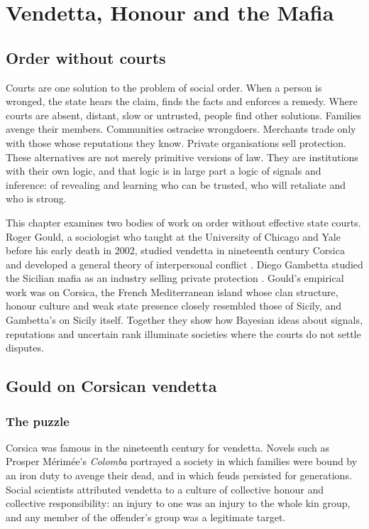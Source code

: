 \chapter{Vendetta, Honour and the Mafia}
\label{ch:gould}

\section{Order without courts}

Courts are one solution to the problem of social order. When a person is wronged, the state hears the claim, finds the facts and enforces a remedy. Where courts are absent, distant, slow or untrusted, people find other solutions. Families avenge their members. Communities ostracise wrongdoers. Merchants trade only with those whose reputations they know. Private organisations sell protection. These alternatives are not merely primitive versions of law. They are institutions with their own logic, and that logic is in large part a logic of signals and inference: of revealing and learning who can be trusted, who will retaliate and who is strong.

This chapter examines two bodies of work on order without effective state courts. Roger Gould, a sociologist who taught at the University of Chicago and Yale before his early death in 2002, studied vendetta in nineteenth century Corsica and developed a general theory of interpersonal conflict \citep{gould2000,gould2003}. Diego Gambetta studied the Sicilian mafia as an industry selling private protection \citep{gambetta1993}. Gould's empirical work was on Corsica, the French Mediterranean island whose clan structure, honour culture and weak state presence closely resembled those of Sicily, and Gambetta's on Sicily itself. Together they show how Bayesian ideas about signals, reputations and uncertain rank illuminate societies where the courts do not settle disputes.

\section{Gould on Corsican vendetta}

\subsection{The puzzle}

Corsica was famous in the nineteenth century for vendetta. Novels such as Prosper M\'erim\'ee's \emph{Colomba} portrayed a society in which families were bound by an iron duty to avenge their dead, and in which feuds persisted for generations. Social scientists attributed vendetta to a culture of collective honour and collective responsibility: an injury to one was an injury to the whole kin group, and any member of the offender's group was a legitimate target.

